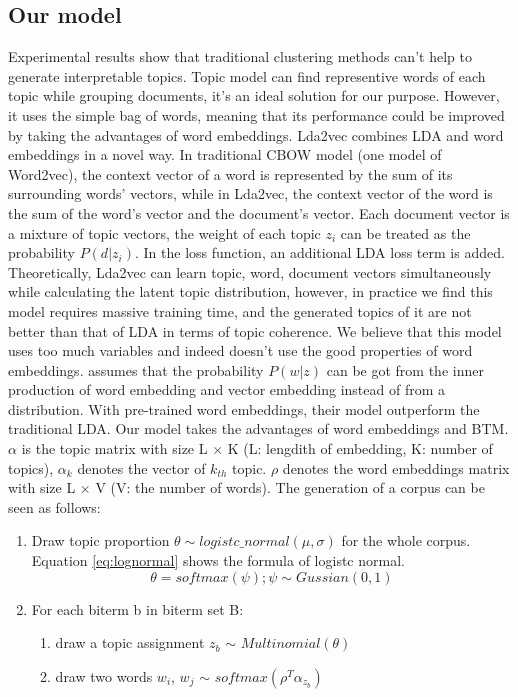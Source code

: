 \subsection{Our model}
\label{sec:modeling}
Experimental results show that traditional clustering methods can't help to generate interpretable topics.
Topic model can find representive words of each topic while grouping documents, it's an ideal solution for our purpose. However, it uses the simple bag of words, meaning that its performance could be improved by taking the advantages of word embeddings. Lda2vec \cite{moody2016mixing} combines LDA and word embeddings in a novel way. In traditional CBOW model (one model of Word2vec), the context vector of a word is represented by the sum of its surrounding words' vectors, while in Lda2vec, the context vector of the word is the sum of the word's vector and the document's vector. Each document vector is a mixture of topic vectors, the weight of each topic $z_i$ can be treated as the probability $P(d|z_i)$. In the loss function, an additional LDA loss term is added. Theoretically, Lda2vec can learn topic, word, document vectors simultaneously while calculating the latent topic distribution, however, in practice we find this model requires massive training time, and the generated topics of it are not better than that of LDA in terms of topic coherence. We believe that this model uses too much variables and indeed doesn't use the good properties of word embeddings. \cite{dieng2019topic} assumes that the probability $P(w|z)$ can be got from the inner production of word embedding and vector embedding instead of from a distribution. With pre-trained word embeddings, their model outperform the traditional LDA. Our model takes the advantages of word embeddings and BTM. $\alpha$ is the topic matrix with size L $\times$ K (L: lengdith of embedding, K: number of topics), $\alpha_k$ denotes the vector of $k_{th}$ topic. $\rho$ denotes the word embeddings matrix with size L $\times$ V (V: the number of words). The generation of a corpus can be seen as follows:
\begin{enumerate}
    \item Draw topic proportion $\theta \sim logistc\_normal(\mu, \sigma)$ for the whole corpus.\\ Equation \ref{eq:lognormal} shows the formula of logistc normal.
    \begin{equation}
        \theta=softmax(\psi); \psi \sim Gussian(0,1)
        \label{eq:lognormal}
    \end{equation}
    \item For each biterm b in biterm set B:
    \begin{enumerate}
        \item draw a topic assignment $z_b$ $\sim$ $Multinomial(\theta)$
        \item draw two words $w_i$, $w_j$ $\sim$ $softmax(\rho^T\alpha_{z_b})$ 
    \end{enumerate}
\end{enumerate} 
